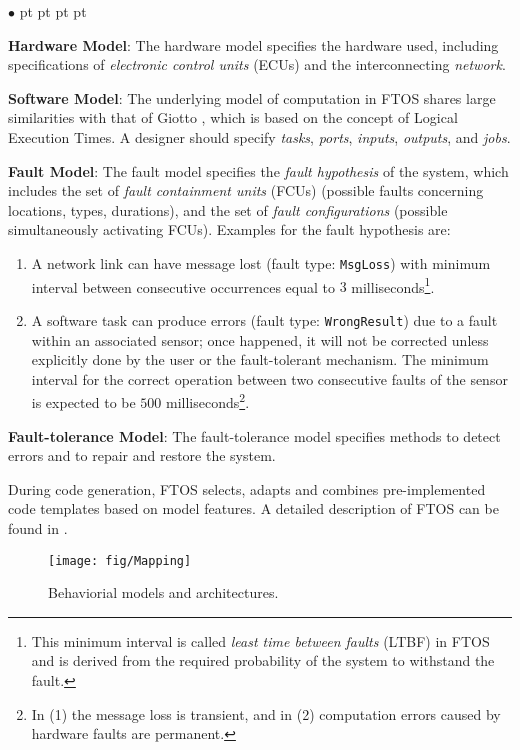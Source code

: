 \documentclass[10pt, a4paper, onecolumn, conference, compsocconf]{IEEEtran}
\newenvironment{list1}{\begin{list}{$\bullet$}
{\topsep 0 pt \parsep 0 pt \partopsep 0 pt \itemsep 0
pt}}{\end{list}}
\begin{document}
\begin{list1}
    \item \textbf{Hardware Model}: The hardware model specifies the hardware used, including specifications of \emph{electronic control units} (ECUs) and the interconnecting \emph{network}.
    \item \textbf{Software Model}: The underlying model of computation in FTOS shares large similarities with that of Giotto \cite{Henzinger01giotto:a}, which is based on the concept of Logical Execution Times. A designer should specify \emph{tasks}, \emph{ports}, \emph{inputs}, \emph{outputs}, and \emph{jobs}.
    \item \textbf{Fault Model}: The fault model specifies the \emph{fault hypothesis} of the system, which includes the set of \emph{fault containment units} (FCUs) (possible faults concerning locations, types, durations), and the set of \emph{fault configurations}
                                (possible simultaneously activating FCUs). Examples for the fault hypothesis are:
                                \begin{enumerate}
\item A network link can have message lost (fault type: \verb"MsgLoss") with minimum interval between consecutive occurrences equal to $3$ milliseconds\footnote{This minimum interval is called \emph{least time between faults} (LTBF) in FTOS and is derived from the required probability of the system to withstand the fault.}.
\item A software task can produce errors (fault type: \verb"WrongResult") due to a fault within an associated sensor; once happened, it will not be corrected unless explicitly done by the user or the fault-tolerant mechanism. The minimum interval for the correct operation between two consecutive faults of the sensor is expected to be $500$ milliseconds\footnote{In (1) the message loss is transient, and in (2) computation errors caused by hardware faults are permanent.}.
\end{enumerate}
    \item \textbf{Fault-tolerance Model}: The fault-tolerance model specifies methods to detect errors and to repair and restore the system.
\end{list1}

During code generation, FTOS selects, adapts and combines pre-implemented code templates based on model features. A detailed description of FTOS can be found in \cite{buckl:2008}.

\begin{figure}
 \centering
 \texttt{[image: fig/Mapping]}
 \caption{Behaviorial models and architectures.}
 \label{fig:Mapping}
\end{figure}
\end{document}
